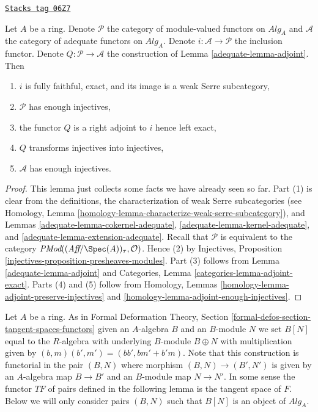 \begin{lemma}
\label{adequate-lemma-enough-injectives}
\href{https://stacks.math.columbia.edu/tag/06Z7}{\texttt{Stacks tag 06Z7}}

Let $A$ be a ring. Denote $\mathcal{P}$ the category of module-valued
functors on $\textit{Alg}_A$ and $\mathcal{A}$ the category of adequate
functors on $\textit{Alg}_A$. Denote $i : \mathcal{A} \to \mathcal{P}$
the inclusion functor. Denote $Q : \mathcal{P} \to \mathcal{A}$
the construction of Lemma \ref{adequate-lemma-adjoint}.
Then
\begin{enumerate}
\item $i$ is fully faithful, exact, and its image is a weak Serre subcategory,
\item $\mathcal{P}$ has enough injectives,
\item the functor $Q$ is a right adjoint to $i$ hence left exact,
\item $Q$ transforms injectives into injectives,
\item $\mathcal{A}$ has enough injectives.
\end{enumerate}
\end{lemma}

\begin{proof}

This lemma just collects some facts we have already seen so far.
Part (1) is clear from the definitions, the characterization of
weak Serre subcategories (see
Homology, Lemma \ref{homology-lemma-characterize-weak-serre-subcategory}),
and
Lemmas \ref{adequate-lemma-cokernel-adequate}, \ref{adequate-lemma-kernel-adequate},
and \ref{adequate-lemma-extension-adequate}.
Recall that $\mathcal{P}$ is equivalent to the category
$\textit{PMod}((\textit{Aff}/\Spec(A))_\tau, \mathcal{O})$.
Hence (2) by
Injectives, Proposition \ref{injectives-proposition-presheaves-modules}.
Part (3) follows from
Lemma \ref{adequate-lemma-adjoint}
and
Categories, Lemma \ref{categories-lemma-adjoint-exact}.
Parts (4) and (5) follow from
Homology, Lemmas \ref{homology-lemma-adjoint-preserve-injectives} and
\ref{homology-lemma-adjoint-enough-injectives}.
\end{proof}

Let $A$ be a ring. As in
Formal Deformation Theory, Section
\ref{formal-defos-section-tangent-spaces-functors}
given an $A$-algebra $B$ and an $B$-module $N$ we set $B[N]$ equal to
the $R$-algebra with underlying $B$-module $B \oplus N$ with multiplication
given by $(b, m)(b', m ') = (bb', bm' + b'm)$. Note that this construction
is functorial in the pair $(B, N)$ where morphism $(B, N) \to (B', N')$
is given by an $A$-algebra map $B \to B'$ and an $B$-module map
$N \to N'$. In some sense the functor $TF$ of pairs defined in the following
lemma is the tangent space of $F$.
Below we will only consider pairs $(B, N)$ such that
$B[N]$ is an object of $\textit{Alg}_A$.

